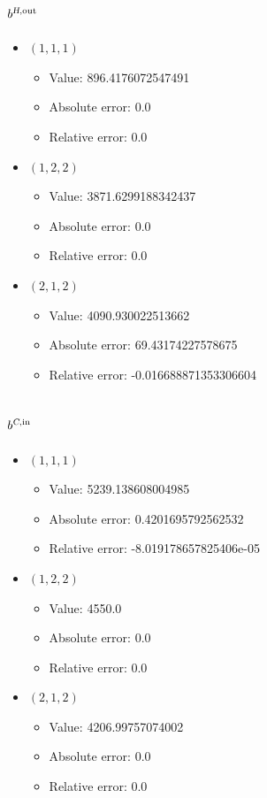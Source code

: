 \documentclass{article}%
\begin{document}
\subsection{$b^{\textsl{H},\text{out}}$}%
\begin{itemize}%
	\item $(1, 1, 1)$%
	\begin{itemize}%
		\item Value: 896.4176072547491%
		\item Absolute error: 0.0%
		\item Relative error: 0.0%
	\end{itemize}%
	\item $(1, 2, 2)$%
	\begin{itemize}%
		\item Value: 3871.6299188342437%
		\item Absolute error: 0.0%
		\item Relative error: 0.0%
	\end{itemize}%
	\item $(2, 1, 2)$%
	\begin{itemize}%
		\item Value: 4090.930022513662%
		\item Absolute error: 69.43174227578675%
		\item Relative error: -0.016688871353306604%
	\end{itemize}%
\end{itemize}%
\subsection{$b^{\textsl{C},\text{in}}$}%
\begin{itemize}%
	\item $(1, 1, 1)$%
	\begin{itemize}%
		\item Value: 5239.138608004985%
		\item Absolute error: 0.4201695792562532%
		\item Relative error: -8.019178657825406e-05%
	\end{itemize}%
	\item $(1, 2, 2)$%
	\begin{itemize}%
		\item Value: 4550.0%
		\item Absolute error: 0.0%
		\item Relative error: 0.0%
	\end{itemize}%
	\item $(2, 1, 2)$%
	\begin{itemize}%
		\item Value: 4206.99757074002%
		\item Absolute error: 0.0%
		\item Relative error: 0.0%
	\end{itemize}%
\end{itemize}%
\end{document}
